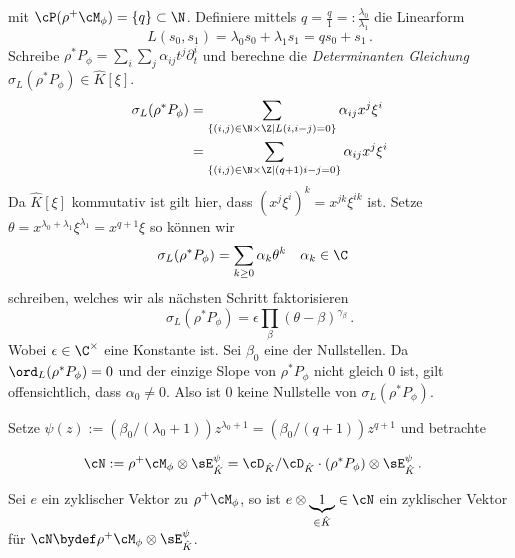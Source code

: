mit $\cP(\rho^+\cM_\phi)=\{q\}\subset\N$. Definiere mittels
$q=\frac{q}{1}=:\frac{\lambda_0}{\lambda_1}$ die  Linearform
\[
L(s_0,s_1)=\lambda_0s_0+\lambda_1s_1=qs_0+s_1 \,.
\]
Schreibe $\rho^*P_{\phi}=\sum_i\sum_j\alpha_{ij}t^j\partial_t^i$ und berechne
die \emph{Determinanten Gleichung} $\sigma_L(\rho^*P_{\phi})\in \hat K[\xi]$.
\begin{align*}
\sigma_L(\rho^*P_{\phi})
  &= \sum_{\{(i,j)\in\N\times\Z \mid L(i,i-j)=0\}}\alpha_{ij}x^j\xi^i\\
  &= \sum_{\{(i,j)\in\N\times\Z \mid (q+1)i-j=0\}}\alpha_{ij}x^j\xi^i
\end{align*}
Da $\hat K[\xi]$ kommutativ ist gilt hier, dass $(x^j\xi^i)^k=x^{jk}\xi^{ik}$ ist.
Setze $\theta=x^{\lambda_0+\lambda_1}\xi^{\lambda_1}=x^{q+1}\xi$ so können wir
\begin{align*}
\sigma_L(\rho^*P_{\phi}) &= \sum_{k\geq 0}\alpha_k\theta^k & & \alpha_k\in\C
\end{align*}
schreiben, welches wir als nächsten Schritt faktorisieren
\[
\sigma_L(\rho^*P_\phi)=\epsilon\prod_{\beta}(\theta-\beta)^{\gamma_\beta}\,.
\]
Wobei $\epsilon\in\C^\times$ eine Konstante ist.
Sei $\beta_0$  eine der Nullstellen.
Da $\ord_L(\rho^*P_\phi)=0$ und der einzige Slope von $\rho^*P_\phi$ nicht
gleich $0$ ist, gilt offensichtlich, dass $\alpha_0\neq0$. Also ist $0$ keine
Nullstelle von $\sigma_L(\rho^*P_\phi)$.
\begin{comment}
Setze $R(z):=(\beta_0/(\lambda_0+1))z^{\lambda_0+1}=(\beta_0/(q+1)z^{q+1}$ und
betrachte
\begin{align*}
\rho^+\cM_\phi\otimes\cF_{\hat K}^R
  &= \cD_{\hat K}/\cD_{\hat K}\cdot(\rho^*P_{\phi})\otimes\cF_{\hat K}^R \,.
\end{align*}
\end{comment}
Setze $\psi(z):=(\beta_0/(\lambda_0+1))z^{\lambda_0+1}=(\beta_0/(q+1))z^{q+1}$
und betrachte
\begin{comment}
TODO: bei Hedwig ist es $\beta/\lambda \cdot x^{-\lambda}$
\end{comment}
\begin{align*}
\cN:=\rho^+\cM_\phi\otimes\sE_{\hat K}^\psi
  &= \cD_{\hat K}/\cD_{\hat K}\cdot(\rho^*P_{\phi})\otimes\sE_{\hat K}^\psi \,.
\end{align*}
\begin{lem}
Sei $e$ ein zyklischer Vektor zu $\rho^+\cM_\phi$, so ist $e\otimes
\underset{\in\hat K}{\underbrace{1}}\in\cN$ ein zyklischer Vektor für
$\cN\bydef\rho^+\cM_\phi\otimes\sE_{\hat K}^\psi$.
\end{lem}
